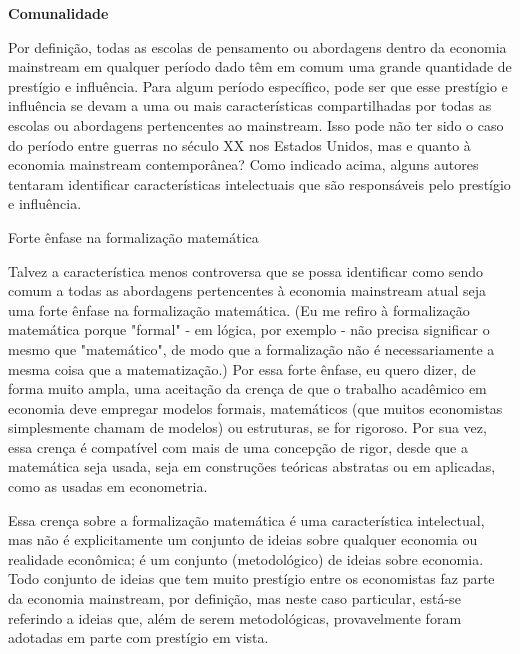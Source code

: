 \documentclass[a4paper,12pt]{article}[abntex2]
\begin{document}
\textbf{Comunalidade}

Por definição, todas as escolas de pensamento ou abordagens dentro da economia mainstream em qualquer período dado têm em comum uma grande quantidade de prestígio e influência. Para algum período específico, pode ser que esse prestígio e influência se devam a uma ou mais características compartilhadas por todas as escolas ou abordagens pertencentes ao mainstream. Isso pode não ter sido o caso do período entre guerras no século XX nos Estados Unidos, mas e quanto à economia mainstream contemporânea? Como indicado acima, alguns autores tentaram identificar características intelectuais que são responsáveis pelo prestígio e influência.

Forte ênfase na formalização matemática

Talvez a característica menos controversa que se possa identificar como sendo comum a todas as abordagens pertencentes à economia mainstream atual seja uma forte ênfase na formalização matemática. (Eu me refiro à formalização matemática porque "formal" - em lógica, por exemplo - não precisa significar o mesmo que "matemático", de modo que a formalização não é necessariamente a mesma coisa que a matematização.) Por essa forte ênfase, eu quero dizer, de forma muito ampla, uma aceitação da crença de que o trabalho acadêmico em economia deve empregar modelos formais, matemáticos (que muitos economistas simplesmente chamam de modelos) ou estruturas, se for rigoroso. Por sua vez, essa crença é compatível com mais de uma concepção de rigor, desde que a matemática seja usada, seja em construções teóricas abstratas ou em aplicadas, como as usadas em econometria.

Essa crença sobre a formalização matemática é uma característica intelectual, mas não é explicitamente um conjunto de ideias sobre qualquer economia ou realidade econômica; é um conjunto (metodológico) de ideias sobre economia. Todo conjunto de ideias que tem muito prestígio entre os economistas faz parte da economia mainstream, por definição, mas neste caso particular, está-se referindo a ideias que, além de serem metodológicas, provavelmente foram adotadas em parte com prestígio em vista.
\end{document}
